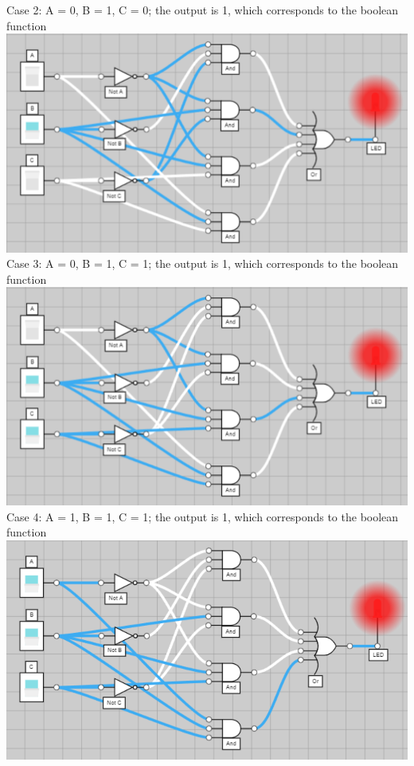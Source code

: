 \documentclass[11pt]{article}
\begin{document}
\begin{enumerate}
        Case 2: A = 0, B = 1, C = 0; the output is 1, which corresponds to the boolean function\\
        \includegraphics[scale=0.38]{0_1_0}\\[0.25in]
        Case 3: A = 0, B = 1, C = 1; the output is 1, which corresponds to the boolean function\\
        \includegraphics[scale=0.38]{0_1_1}\\[0.25in]
        Case 4: A = 1, B = 1, C = 1; the output is 1, which corresponds to the boolean function\\
        \includegraphics[scale=0.38]{1_1_1}\\[0.25in]

\end{enumerate}
\end{document}

